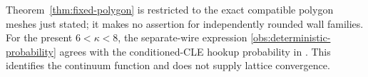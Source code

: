 Theorem~\ref{thm:fixed-polygon} is restricted to the exact compatible
polygon meshes just stated; it makes no assertion for independently
rounded wall families.  For the present $6<\kappa<8$, the separate-wire
expression \eqref{obs:deterministic-probability} agrees with the
conditioned-CLE hookup probability in
\cite[Theorem~1, equations~(4.1)--(4.3)]{MillerWerner2018CLEConnections}.
This identifies the continuum function and does not supply lattice
convergence.
